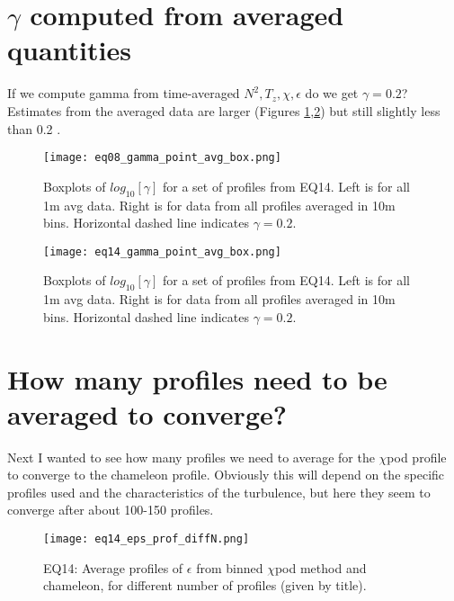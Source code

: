 \documentclass[11pt]{article}
\begin{document}
\clearpage
\section{$\gamma$ computed from averaged quantities}

If we compute gamma from time-averaged $N^2,T_z,\chi,\epsilon$ do we get $\gamma=0.2$? Estimates from the averaged data are larger (Figures \ref{gambox_eq08},\ref{gambox_eq14}) but still slightly less than 0.2 .

\begin{figure}[htbp]
\texttt{[image: eq08\_gamma\_point\_avg\_box.png]}
\caption{Boxplots of $log_{10}[\gamma]$ for a set of profiles from EQ14. Left is for all 1m avg data. Right is for data from all profiles averaged in 10m bins. Horizontal dashed line indicates $\gamma=0.2$.}
\label{gambox_eq08}
\end{figure}

\begin{figure}[htbp]
\texttt{[image: eq14\_gamma\_point\_avg\_box.png]}
\caption{Boxplots of $log_{10}[\gamma]$ for a set of profiles from EQ14. Left is for all 1m avg data. Right is for data from all profiles averaged in 10m bins. Horizontal dashed line indicates $\gamma=0.2$.}
\label{gambox_eq14}
\end{figure}


\clearpage
\section{How many profiles need to be averaged to converge?}

Next I wanted to see how many profiles we need to average for the $\chi$pod profile to converge to the chameleon profile. Obviously this will depend on the specific profiles used and the characteristics of the turbulence, but here they seem to converge after about 100-150 profiles. 


\begin{figure}[htbp]
\texttt{[image: eq14\_eps\_prof\_diffN.png]}
\caption{EQ14: Average profiles of $\epsilon$ from binned $\chi$pod method and chameleon, for different number of profiles (given by title).}
\label{}
\end{figure}
\end{document}
